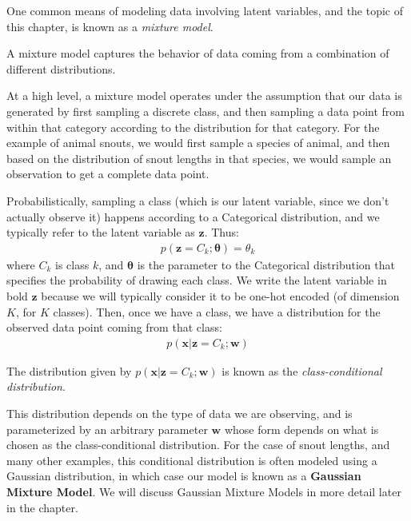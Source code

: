 One common means of modeling data involving latent variables, and the topic of this chapter, is known as a \textit{mixture model}.

\begin{definition}
    A mixture model captures the behavior of data coming from a combination of different distributions.
\end{definition}

At a high level, a mixture model operates under the assumption that our data is generated by first sampling a discrete class, and then sampling a data point from within that category according to the distribution for that category. For the example of animal snouts, we would first sample a species of animal, and then based on the distribution of snout lengths in that species, we would sample an observation to get a complete data point.

Probabilistically, sampling a class (which is our latent variable, since we don't actually observe it) happens according to a Categorical distribution, and we typically refer to the latent variable as $\textbf{z}$. Thus:
\begin{align*}
    p(\textbf{z} = C_{k} ; \boldsymbol{\theta}) = \theta_{k}
\end{align*}
where $C_{k}$ is class $k$, and $\boldsymbol{\theta}$ is the parameter to the Categorical distribution that specifies the probability of drawing each class. We write the latent variable in bold $\textbf{z}$ because  we will typically
consider it to be one-hot encoded (of dimension $K$, for $K$ classes).
Then, once we have a class, we have a distribution for the observed data point coming from that class:
\begin{align*}
    p(\textbf{x} | \textbf{z} = C_{k}; \textbf{w})
\end{align*}
\begin{warning}
    The distribution given by $p(\textbf{x} | \textbf{z} = C_{k}; \textbf{w})$ is known as the \textit{class-conditional distribution}.
\end{warning}
This distribution depends on the type of data we are observing, and is parameterized by an arbitrary parameter $\textbf{w}$ whose form depends on what is chosen as the class-conditional distribution. For the case of snout lengths, and many other examples, this conditional distribution is often modeled using a Gaussian distribution, in which case our model is known as a \textbf{Gaussian Mixture Model}. We will discuss Gaussian Mixture Models in more detail later in the chapter.

